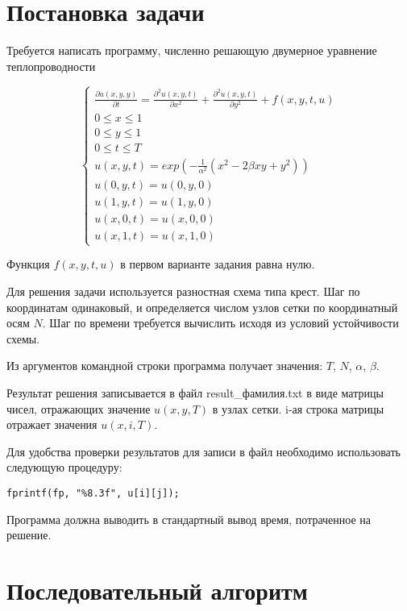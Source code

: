 \documentclass[11pt, oneside, a4paper]{article}
\begin{document}
\thispagestyle{empty}

\section{Постановка задачи}

Требуется написать программу, численно решающую двумерное уравнение теплопроводности

\begin{displaymath}
\left\{\begin{array}{l}
\frac{\partial u(x, y, y)}{\partial t} = \frac{\partial^2 u(x, y, t)}{\partial x^2} + \frac{\partial^2 u(x, y, t)}{\partial y^2} + f(x, y, t, u) \\
0 \le x \le 1 \\
0 \le y \le 1 \\
0 \le t \le T \\
u(x, y, t) = exp(-\frac{1}{\alpha^2}(x^2 - 2 \beta x y + y^2)) \\
u(0, y, t) = u(0, y, 0) \\
u(1, y, t) = u(1, y, 0) \\
u(x, 0, t) = u(x, 0, 0) \\
u(x, 1, t) = u(x, 1, 0)
\end{array}\right.
\end{displaymath}

Функция $f(x, y, t, u)$ в первом варианте задания равна нулю.

Для решения задачи используется разностная схема типа крест. Шаг по координатам одинаковый, и определяется числом узлов сетки по координатный осям $N$. Шаг по времени требуется вычислить исходя из условий устойчивости схемы.

Из аргументов командной строки программа получает значения: $T$, $N$, $\alpha$, $\beta$.

Результат решения записывается в файл result\_фамилия.txt в виде матрицы чисел, отражающих значение $u(x, y, T)$ в узлах сетки. i-ая строка матрицы отражает значения $u(x, i, T)$.

Для удобства проверки результатов для записи в файл необходимо использовать следующую процедуру:

\begin{lstlisting}
fprintf(fp, "%8.3f", u[i][j]);
\end{lstlisting}

Программа должна выводить в стандартный вывод время, потраченное на решение.

\section{Последовательный алгоритм}
\end{document}
